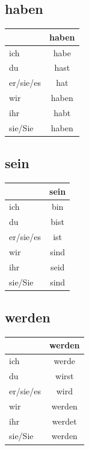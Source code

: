 \subsection{haben}
\label{sec:Habentaben}

\begin{center}
\begin{tabular}{|l|c|}
\hline
\textbf{} & \textbf{haben} \\ \hline
ich & habe \\ \hline
du & hast \\ \hline
er/sie/es & hat \\ \hline
wir & haben \\ \hline
ihr & habt \\ \hline
sie/Sie & haben \\ \hline
\end{tabular}
\end{center}

\subsection{sein}
\label{sec:Sein}

\begin{center}
\begin{tabular}{|l|c|}
\hline
\textbf{} & \textbf{sein} \\ \hline
ich & bin \\ \hline
du & bist \\ \hline
er/sie/es & ist \\ \hline
wir & sind \\ \hline
ihr & seid \\ \hline
sie/Sie & sind \\ \hline
\end{tabular}
\end{center}

\subsection{werden}
\label{sec:Werden}

\begin{center}
\begin{tabular}{|l|c|}
\hline
\textbf{} & \textbf{werden} \\ \hline
ich & werde \\ \hline
du & wirst \\ \hline
er/sie/es & wird \\ \hline
wir & werden \\ \hline
ihr & werdet \\ \hline
sie/Sie & werden \\ \hline
\end{tabular}
\end{center}

